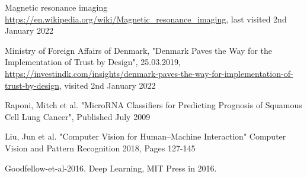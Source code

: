 \documentclass[12pt, fleqn, titlepage]{article}
\begin{document}
\begin{thebibliography}{9}
		 Magnetic resonance imaging \url{https://en.wikipedia.org/wiki/Magnetic_resonance_imaging}, last visited 2nd January 2022
		
		 Ministry of Foreign Affairs of Denmark, "Denmark Paves the Way for the Implementation of Trust by Design", 25.03.2019, \url{https://investindk.com/insights/denmark-paves-the-way-for-implementation-of-trust-by-design}, visited 2nd January 2022
		
		 Raponi, Mitch et al. "MicroRNA Classifiers for Predicting Prognosis of Squamous Cell Lung Cancer", Published July 2009
		
		 Liu, Jun et al. "Computer Vision for Human–Machine Interaction" Computer Vision and Pattern Recognition 2018, Pages 127-145
		
		 Goodfellow-et-al-2016. Deep Learning, MIT Press in 2016.
		
			
	\end{thebibliography}
	
	
	\newpage
	
	
	
	
	
	
\end{document}
